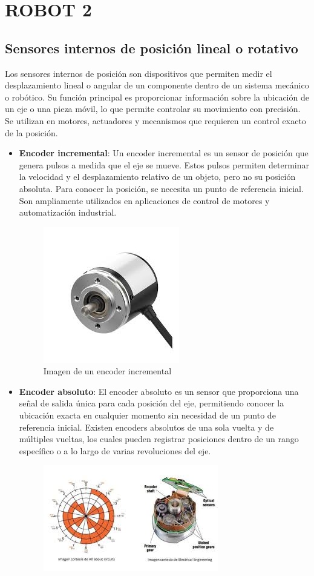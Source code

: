\section{ROBOT 2}
\subsection{Sensores internos de posición lineal o rotativo}
Los sensores internos de posición son dispositivos que permiten medir el desplazamiento lineal o angular de un componente dentro de un sistema mecánico o robótico. Su función principal es proporcionar información sobre la ubicación de un eje o una pieza móvil, lo que permite controlar su movimiento con precisión. Se utilizan en motores, actuadores y mecanismos que requieren un control exacto de la posición.

\begin{itemize}
\item \textbf{Encoder incremental}: Un encoder incremental es un sensor de posición que genera pulsos a medida que el eje se mueve. Estos pulsos permiten determinar la velocidad y el desplazamiento relativo de un objeto, pero no su posición absoluta. Para conocer la posición, se necesita un punto de referencia inicial. Son ampliamente utilizados en aplicaciones de control de motores y automatización industrial.
\begin{figure}[h]
	\centering
	\includegraphics[width=4 cm]{img/EncoderIn}
	\caption{Imagen de un encoder incremental}
	\label{fig:EncoderIn}
\end{figure}
\item \textbf{Encoder absoluto}: El encoder absoluto es un sensor que proporciona una señal de salida única para cada posición del eje, permitiendo conocer la ubicación exacta en cualquier momento sin necesidad de un punto de referencia inicial. Existen encoders absolutos de una sola vuelta y de múltiples vueltas, los cuales pueden registrar posiciones dentro de un rango específico o a lo largo de varias revoluciones del eje.
\begin{figure}[h]
	\centering
	\includegraphics[width=10 cm]{img/EncoderAb}

\end{figure}
\end{itemize}
